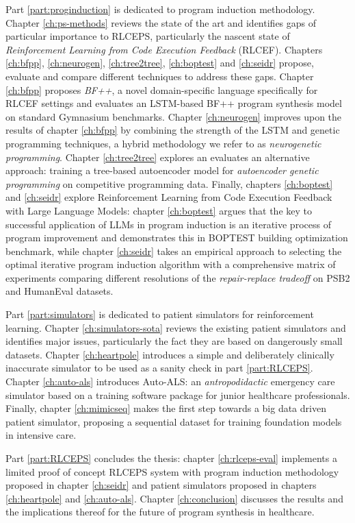 Part \ref{part:proginduction} is dedicated to program induction methodology.
Chapter \ref{ch:ps-methods} reviews the state of the art and identifies gaps of particular importance to RLCEPS, particularly the nascent state of \emph{Reinforcement Learning from Code Execution Feedback} (RLCEF).
Chapters \ref{ch:bfpp}, \ref{ch:neurogen}, \ref{ch:tree2tree}, \ref{ch:boptest} and \ref{ch:seidr} propose, evaluate and compare different techniques to address these gaps.
Chapter \ref{ch:bfpp} proposes \emph{BF++}, a novel domain-specific language specifically for RLCEF settings and evaluates an LSTM-based BF++ program synthesis model on standard Gymnasium \cite{towersGymnasiumStandardInterface2024} benchmarks.
Chapter \ref{ch:neurogen} improves upon the results of chapter \ref{ch:bfpp} by combining the strength of the LSTM and genetic programming techniques, a hybrid methodology we refer to as \emph{neurogenetic programming}.
Chapter \ref{ch:tree2tree} explores an evaluates an alternative approach: training a tree-based autoencoder model for \emph{autoencoder genetic programming} on competitive programming data.
Finally, chapters \ref{ch:boptest} and \ref{ch:seidr} explore Reinforcement Learning from Code Execution Feedback with Large Language Models: chapter \ref{ch:boptest} argues that the key to successful application of LLMs in program induction is an iterative process of program improvement and demonstrates this in BOPTEST building optimization benchmark, while chapter \ref{ch:seidr} takes an empirical approach to selecting the optimal iterative program induction algorithm with a comprehensive matrix of experiments comparing different resolutions of the \emph{repair-replace tradeoff} on PSB2 and HumanEval datasets.

Part \ref{part:simulators} is dedicated to patient simulators for reinforcement learning.
Chapter \ref{ch:simulators-sota} reviews the existing patient simulators and identifies major issues, particularly the fact they are based on dangerously small datasets.
Chapter \ref{ch:heartpole} introduces a simple and deliberately clinically inaccurate simulator to be used as a sanity check in part \ref{part:RLCEPS}.
Chapter \ref{ch:auto-als} introduces Auto-ALS: an \emph{antropodidactic} emergency care simulator based on a training software package for junior healthcare professionals.
Finally, chapter \ref{ch:mimicseq} makes the first step towards a big data driven patient simulator, proposing a sequential dataset for training foundation models in intensive care.

Part \ref{part:RLCEPS} concludes the thesis: chapter \ref{ch:rlceps-eval} implements a limited proof of concept RLCEPS system with program induction methodology proposed in chapter \ref{ch:seidr} and patient simulators proposed in chapters \ref{ch:heartpole} and \ref{ch:auto-als}.
Chapter \ref{ch:conclusion} discusses the results and the implications thereof for the future of program synthesis in healthcare.